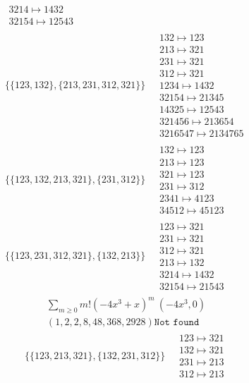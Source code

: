 \begin{scriptsize}
\begin{align}
\begin{matrix}
\\
3214 \mapsto 1432
\\
32154 \mapsto 12543
\end{matrix}
\\
\{\{123, 132\}, \{213, 231, 312, 321\}\}
\ 
&
\begin{matrix}
132 \mapsto 123
\\
213 \mapsto 321
\\
231 \mapsto 321
\\
312 \mapsto 321
\\
1234 \mapsto 1432
\\
32154 \mapsto 21345
\\
14325 \mapsto 12543
\\
321456 \mapsto 213654
\\
3216547 \mapsto 2134765
\end{matrix}
\\
\{\{123, 132, 213, 321\}, \{231, 312\}\}
\ 
&
\begin{matrix}
132 \mapsto 123
\\
213 \mapsto 123
\\
321 \mapsto 123
\\
231 \mapsto 312
\\
2341 \mapsto 4123
\\
34512 \mapsto 45123
\end{matrix}
\\
\{\{123, 231, 312, 321\}, \{132, 213\}\}
\ 
&
\begin{matrix}
123 \mapsto 321
\\
231 \mapsto 321
\\
312 \mapsto 321
\\
213 \mapsto 132
\\
3214 \mapsto 1432
\\
32154 \mapsto 21543
\end{matrix}
\end{align}
$$
\begin{matrix}
\sum_{m \geq 0} m! \left(
-4 x^{3} + x
\right)^m
\ 
\left(-4 x^{3}, 0\right)
\\
\left(1, 2, 2, 8, 48, 368, 2928\right)
\texttt{Not found}
\end{matrix}
$$
\begin{align}
\{\{123, 213, 321\}, \{132, 231, 312\}\}
\ 
&
\begin{matrix}
123 \mapsto 321
\\
132 \mapsto 321
\\
231 \mapsto 213
\\
312 \mapsto 213

\end{matrix}
\end{align}
\end{scriptsize}

